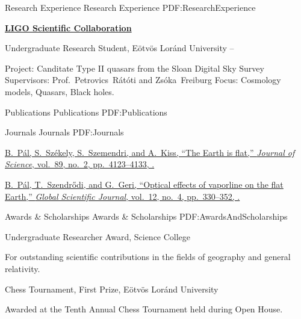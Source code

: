 \documentclass[letterpaper,yyyyMMM,nonstopmode]{simpleresumecv}
\begin{document}
\begin{Body}
\Section
{Research Experience}
{Research Experience}
{PDF:ResearchExperience}

\Entry
\href{https://www.ligo.org/}
{\textbf{LIGO Scientific Collaboration}}

\Gap
\BulletItem
Undergraduate Research Student, Eötvös Loránd University
\hfill
{} --
\begin{Detail}
\SubBulletItem
Project:
Canditate Type II quasars from the Sloan Digital Sky Survey
\SubBulletItem
Supervisors:
Prof.~Petrovics~Rátóti and
Zsóka~Freiburg
\SubBulletItem
Focus:
Cosmology models, Quasars, Black holes.
\end{Detail}


\Section
{Publications}
{Publications}
{PDF:Publications}

\SubSection
{Journals}
{Journals}
{PDF:Journals}

\begingroup
\renewcommand{\MaxNumberedItem}{[88]}

\Gap
\NumberedItem{[1]}
\href{https://fecore.org/project/balaton-laser-experiment/}
{\underline{B.~Pál}, S.~Székely, S.~Szemendri, and A.~Kiss,
``The Earth is flat,''
\textit{Journal of Science},
vol.~89,
no.~2,
pp.~4123--4133,
.}

\Gap
\NumberedItem{[2]}
\href{https://fecore.org/project/reusable-and-recoverable-autonomous-balloon-and-integral-rocket-launch-platform/}
{\underline{B.~Pál}, T.~Szendrődi, and G.~Geri,
``Optical effects of vaporline on the flat Earth,''
\textit{Global Scientific Journal},
vol.~12,
no.~4,
pp.~330--352,
.}

\endgroup


\Section
{Awards \&\newline
Scholarships}
{Awards \& Scholarships}
{PDF:AwardsAndScholarships}

\Gap
\BulletItem
Undergraduate Researcher Award,
Science College
\hfill
{}
\begin{Detail}
\Item
For outstanding scientific contributions in the fields of geography and general relativity.
\end{Detail}

\Gap
\BulletItem
Chess Tournament,
First Prize,
Eötvös Loránd University
\hfill
{}
\begin{Detail}
\Item
Awarded at the Tenth Annual Chess Tournament held during Open House.
\end{Detail}


\end{Body}
\end{document}
